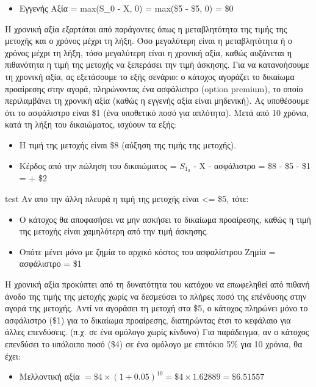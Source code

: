 \begin{itemize}
    \item Εγγενής Αξία = max(S_0 - X, 0) = max(\$5 - \$5, 0) = \$0
\end{itemize}

Η χρονική αξία εξαρτάται από παράγοντες όπως η μεταβλητότητα της τιμής της μετοχής και ο χρόνος μέχρι τη λήξη.
Όσο μεγαλύτερη είναι η μεταβλητότητα ή ο χρόνος μέχρι τη λήξη, τόσο μεγαλύτερη είναι η χρονική αξία, καθώς αυξάνεται η πιθανότητα η τιμή της μετοχής να ξεπεράσει την τιμή άσκησης.
Για να κατανοήσουμε τη χρονική αξία, ας εξετάσουμε το εξής σενάριο: ο κάτοχος αγοράζει το δικαίωμα προαίρεσης στην αγορά,
πληρώνοντας ένα ασφάλιστρο (option premium), το οποίο περιλαμβάνει τη χρονική αξία (καθώς η εγγενής αξία είναι μηδενική). Ας υποθέσουμε ότι το ασφάλιστρο είναι \$1 (ένα υποθετικό ποσό για απλότητα).
Μετά από 10 χρόνια, κατά τη λήξη του δικαιώματος, ισχύουν τα εξής:
\begin{itemize}
    \item Η τιμή της μετοχής είναι \$8 (αύξηση της τιμής της μετοχής).
    \item Κέρδος από την πώληση του δικαιώματος = $S_1_0$ - X - ασφάλιστρο = \$8 - \$5 - \$1 = + \$2
\end{itemize}

 test
Αν απο την άλλη πλευρά η τιμή της μετοχής είναι <= \$5, τότε:
\begin{itemize}
    \item Ο κάτοχος θα αποφασήσει να μην ασκήσει το δικαίωμα προαίρεσης, καθώς η τιμή της μετοχής είναι χαμηλότερη από την τιμή άσκησης.
    \item Οπότε μένει μόνο με ζημία το αρχικό κόστος του ασφαλίστρου Ζημία = ασφάλιστρο = \$1
\end{itemize}

Η χρονική αξία προκύπτει από τη δυνατότητα του κατόχου να επωφεληθεί από πιθανή άνοδο της τιμής της μετοχής χωρίς να δεσμεύσει το πλήρες ποσό της επένδυσης στην αγορά της μετοχής.
Αντί να αγοράσει τη μετοχή στα \$5, ο κάτοχος πληρώνει μόνο το ασφάλιστρο (\$1) για το δικαίωμα προαίρεσης, διατηρώντας έτσι το κεφάλαιο για άλλες επενδύσεις. (π.χ. σε ένα ομόλογο χωρίς κίνδυνο)
Για παράδειγμα, αν ο κάτοχος επενδύσει το υπόλοιπο ποσό (\$4) σε ένα ομόλογο με επιτόκιο 5\% για 10 χρόνια, θα έχει:
\begin{itemize}
    \item Μελλοντική αξία \( = \$4 \times (1 + 0.05)^{10} = \$4 \times 1.62889 = \$6.51557 \)
\end{itemize}

